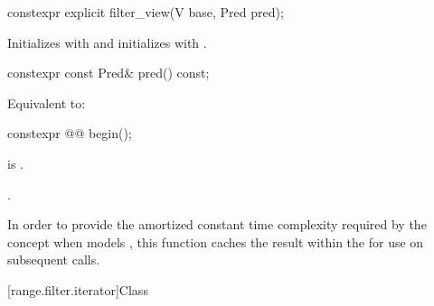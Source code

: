 %
\begin{itemdecl}
constexpr explicit filter_view(V base, Pred pred);
\end{itemdecl}

\begin{itemdescr}
\pnum
\effects
Initializes  with  and initializes
 with .
\end{itemdescr}

%
\begin{itemdecl}
constexpr const Pred& pred() const;
\end{itemdecl}

\begin{itemdescr}
\pnum
\effects
Equivalent to: 
\end{itemdescr}

%
\begin{itemdecl}
constexpr @@ begin();
\end{itemdecl}

\begin{itemdescr}
\pnum
\expects
{} is .

\pnum
\returns
{}.

\pnum
\remarks
In order to provide the amortized constant time complexity required by
the  concept
when  models ,
this function caches the result within the
 for use on subsequent calls.
\end{itemdescr}

[range.filter.iterator]{Class }

